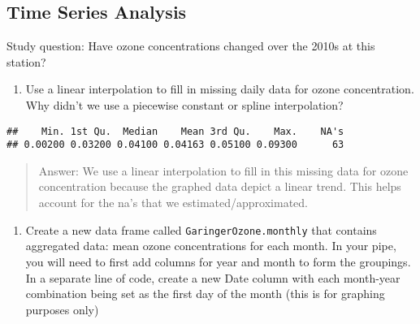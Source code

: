 \documentclass[
]{article}
\newenvironment{Shaded}{\begin{snugshade}}{\end{snugshade}}
\newcommand{\CommentTok}[1]{\textcolor[rgb]{0.56,0.35,0.01}{\textit{#1}}}
\newcommand{\FloatTok}[1]{\textcolor[rgb]{0.00,0.00,0.81}{#1}}
\newcommand{\FunctionTok}[1]{\textcolor[rgb]{0.00,0.00,0.00}{#1}}
\newcommand{\NormalTok}[1]{#1}
\newcommand{\OtherTok}[1]{\textcolor[rgb]{0.56,0.35,0.01}{#1}}
\newcommand{\SpecialCharTok}[1]{\textcolor[rgb]{0.00,0.00,0.00}{#1}}
\providecommand{\tightlist}{%
  \setlength{\itemsep}{0pt}\setlength{\parskip}{0pt}}
\begin{document}
\hypertarget{time-series-analysis}{%
\subsection{Time Series Analysis}\label{time-series-analysis}}

Study question: Have ozone concentrations changed over the 2010s at this
station?

\begin{enumerate}
\def\labelenumi{\arabic{enumi}.}
\setcounter{enumi}{7}
\tightlist
\item
  Use a linear interpolation to fill in missing daily data for ozone
  concentration. Why didn't we use a piecewise constant or spline
  interpolation?
\end{enumerate}

\begin{Shaded}
\end{Shaded}

\begin{verbatim}
##    Min. 1st Qu.  Median    Mean 3rd Qu.    Max.    NA's 
## 0.00200 0.03200 0.04100 0.04163 0.05100 0.09300      63
\end{verbatim}

\begin{Shaded}
\end{Shaded}

\begin{quote}
Answer: We use a linear interpolation to fill in this missing data for
ozone concentration because the graphed data depict a linear trend. This
helps account for the na's that we estimated/approximated.
\end{quote}

\begin{enumerate}
\def\labelenumi{\arabic{enumi}.}
\setcounter{enumi}{8}
\tightlist
\item
  Create a new data frame called \texttt{GaringerOzone.monthly} that
  contains aggregated data: mean ozone concentrations for each month. In
  your pipe, you will need to first add columns for year and month to
  form the groupings. In a separate line of code, create a new Date
  column with each month-year combination being set as the first day of
  the month (this is for graphing purposes only)
\end{enumerate}
\end{document}
